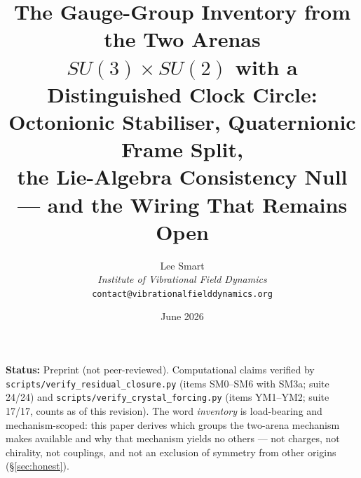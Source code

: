 \documentclass[12pt]{article}
\title{The Gauge-Group Inventory from the Two Arenas\\[6pt]
\large $SU(3)\times SU(2)$ with a Distinguished Clock Circle: Octonionic Stabiliser, Quaternionic Frame Split,\\ the Lie-Algebra Consistency Null --- and the Wiring That Remains Open}
\author{Lee Smart\\ \textit{Institute of Vibrational Field Dynamics}\\ \texttt{contact@vibrationalfielddynamics.org}}
\date{June 2026}
\theoremstyle{definition}
\theoremstyle{remark}
\begin{document}
\maketitle

\noindent\textbf{Status:} Preprint (not peer-reviewed). Computational claims verified by \texttt{scripts/verify\_residual\_closure.py} (items SM0--SM6 with SM3a; suite 24/24) and \texttt{scripts/verify\_crystal\_forcing.py} (items YM1--YM2; suite 17/17, counts as of this revision). The word \emph{inventory} is load-bearing and mechanism-scoped: this paper derives which groups the two-arena mechanism makes available and why that mechanism yields no others --- not charges, not chirality, not couplings, and not an exclusion of symmetry from other origins (\S\ref{sec:honest}).

\begin{abstract}

\end{abstract}
\end{document}
